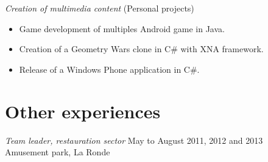 \documentclass{res}
\newcommand{\inFrench}[1]{}
\newcommand{\inEnglish}[1]{#1}
\begin{document}
\begin{resume}
{	{\sl Creation of multimedia content} \hfill (Personal projects)
	\vspace{0.05in}
	\begin{itemize} \itemsep -2pt
		\item Game development of multiples Android game in Java.
		\item Creation of a Geometry Wars clone in C\# with XNA framework.
		\item Release of a Windows Phone application in C\#.
	\end{itemize}
}


\inFrench{
	\section{Expériences connexes}
}
\inEnglish{
	\section{Other experiences}
}
\vspace{6pt}

\inFrench{
	{\sl Chef d'équipe, secteur restauration}
		\hfill mai à août 2011, 2012 et 2013 \\
	Parc d'attractions La Ronde

	\vspace{0.05in}
	\begin{itemize} \itemsep -2pt
		\item Gestion et formation continue de 8 à 11 personnes;
		\item Gestion des inventaires, des commandes et du fonctionnement de quatre points de vente;
		\item Responsable d’une partie de la communication entre les superviseurs et les préposés;
		\item Formation des nouveaux employés.
	\end{itemize}


	{\sl Cuisinier, secteur restauration}
		\hfill mai à août 2010 \\
	Parc d'attractions La Ronde

	\vspace{0.05in}
	\begin{itemize} \itemsep -2pt
		\item Gestion des périodes d’achalandages et de mon espace de travail.
	\end{itemize}
}

\inEnglish{
	{\sl Team leader, restauration sector}
		\hfill May to August 2011, 2012 and 2013 \\
	Amusement park, La Ronde

}
\end{resume}
\end{document}
